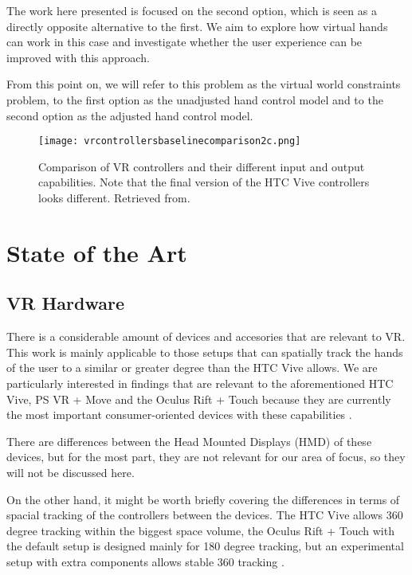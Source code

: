 The work here presented is focused on the second option, which is seen as a directly opposite alternative to the first. We aim to explore how virtual hands can work in this case and investigate whether the user experience can be improved with this approach.

From this point on, we will refer to this problem as the virtual world constraints problem, to the first option as the unadjusted hand control model and to the second option as the adjusted hand control model.

\begin{figure}[h]
\centering
\texttt{[image: vrcontrollersbaselinecomparison2c.png]}
\caption{Comparison of VR controllers and their different input and output capabilities. Note that the final version of the HTC Vive controllers looks different. Retrieved from\parencite{MetanautVR2015}.}
\label{fig:vrControllerComparison}
\end{figure}

\section{State of the Art}
\label{sec:stateOfTheArt}

\subsection{VR Hardware}
\label{subsec:vrHardware}

There is a considerable amount of devices and accesories that are relevant to VR. This work is mainly applicable to those setups that can spatially track the hands of the user to a similar or greater degree than the HTC Vive allows. We are particularly interested in findings that are relevant to the aforementioned HTC Vive, PS VR + Move and the Oculus Rift + Touch because they are currently the most important consumer-oriented devices with these capabilities \parencite{Armstrong2017, SuperDataLLC2017}.



There are differences between the Head Mounted Displays (HMD) of these devices, but for the most part, they are not relevant for our area of focus, so they will not be discussed here.

On the other hand, it might be worth briefly covering the differences in terms of spacial tracking of the controllers between the devices. The HTC Vive allows 360 degree tracking within the biggest space volume, the Oculus Rift + Touch with the default setup is designed mainly for 180 degree tracking, but an experimental setup with extra components allows stable 360 tracking \parencite{Lang2016, Kuchera2016}.

